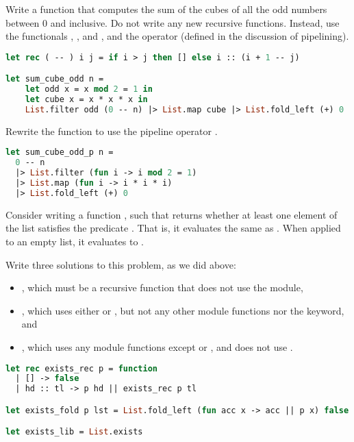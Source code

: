 Write a function  that computes the sum of the cubes of all the odd numbers between 0 and  inclusive. Do not write any new recursive functions. Instead, use the functionals , , and , and the \code{( -- )} operator (defined in the discussion of pipelining).

\begin{lstlisting}[language=OCaml]
let rec ( -- ) i j = if i > j then [] else i :: (i + 1 -- j)

let sum_cube_odd n =
	let odd x = x mod 2 = 1 in
	let cube x = x * x * x in
	List.filter odd (0 -- n) |> List.map cube |> List.fold_left (+) 0
\end{lstlisting}

Rewrite the function  to use the pipeline operator \code{|>}.

\begin{lstlisting}[language=OCaml]
let sum_cube_odd_p n =
  0 -- n
  |> List.filter (fun i -> i mod 2 = 1)
  |> List.map (fun i -> i * i * i)
  |> List.fold_left (+) 0
\end{lstlisting}

\problem[exists]
Consider writing a function , such that  returns whether at least one element of the list satisfies the predicate . That is, it evaluates the same as . When applied to an empty list, it evaluates to .

Write three solutions to this problem, as we did above:
\begin{itemize}
  \item {}, which must be a recursive function that does not use the  module,
  \item {}, which uses either  or , but not any other  module functions nor the  keyword, and
  \item {}, which uses any  module functions except  or , and does not use .
\end{itemize}

\begin{lstlisting}[language=OCaml]
let rec exists_rec p = function
  | [] -> false
  | hd :: tl -> p hd || exists_rec p tl

let exists_fold p lst = List.fold_left (fun acc x -> acc || p x) false lst

let exists_lib = List.exists
\end{lstlisting}

